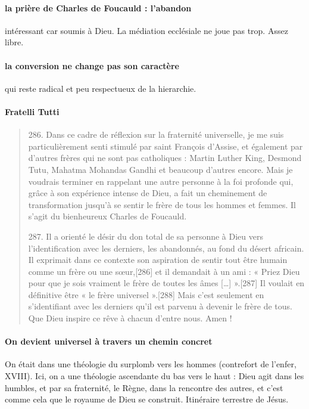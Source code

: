 \paragraph{la prière de Charles de Foucauld : l'abandon} intéressant car soumis à Dieu. La médiation ecclésiale ne joue pas trop. Assez libre. 

\paragraph{la conversion ne change pas son caractère} qui reste radical et peu respectueux de la hierarchie.

\paragraph{Fratelli Tutti} \begin{quote} 
    286. Dans ce cadre de réflexion sur la fraternité universelle, je me suis particulièrement senti stimulé par saint François d’Assise, et également par d’autres frères qui ne sont pas catholiques : Martin Luther King, Desmond Tutu, Mahatma Mohandas Gandhi et beaucoup d’autres encore. Mais je voudrais terminer en rappelant une autre personne à la foi profonde qui, grâce à son expérience intense de Dieu, a fait un cheminement de transformation jusqu’à se sentir le frère de tous les hommes et femmes. Il s’agit du bienheureux Charles de Foucauld.

287. Il a orienté le désir du don total de sa personne à Dieu vers l’identification avec les derniers, les abandonnés, au fond du désert africain. Il exprimait dans ce contexte son aspiration de sentir tout être humain comme un frère ou une sœur,[286] et il demandait à un ami : « Priez Dieu pour que je sois vraiment le frère de toutes les âmes […] ».[287] Il voulait en définitive être « le frère universel ».[288] Mais c’est seulement en s’identifiant avec les derniers qu’il est parvenu à devenir le frère de tous. Que Dieu inspire ce rêve à chacun d’entre nous. Amen !
\end{quote}


\paragraph{On devient universel à travers un chemin concret} On était dans une théologie du surplomb vers les hommes (contrefort de l'enfer, XVIII). Ici, on a une théologie ascendante du bas vers le haut : Dieu agit dans les humbles, et par sa fraternité, le Règne, dans la rencontre des autres, et c'est comme cela que le royaume de Dieu se construit. Itinéraire terrestre de Jésus.

